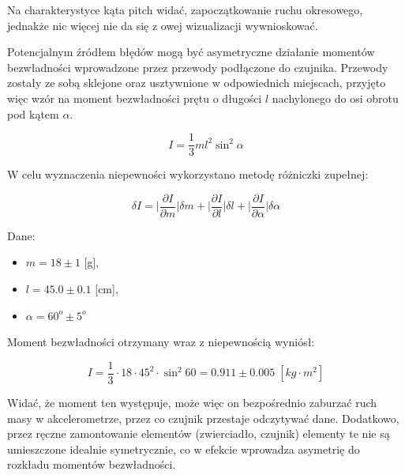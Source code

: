 Na charakterystyce kąta pitch widać, zapoczątkowanie ruchu okresowego, jednakże nic więcej nie da się z owej wizualizacji wywnioskować.

Potencjalnym źródłem błędów mogą być asymetryczne działanie momentów bezwładności wprowadzone przez przewody podłączone do czujnika. Przewody zostały ze sobą sklejone oraz usztywnione w odpowiednich miejscach, przyjęto więc wzór na moment bezwładności prętu o długości $l$ nachylonego do osi obrotu pod kątem $\alpha$.

\begin{equation}
    I = \frac{1}{3}ml^{2}\sin^{2}{\alpha}
\end{equation}

W celu wyznaczenia niepewności wykorzystano metodę różniczki zupełnej:

\begin{equation}
    \delta I = \Bigg|\frac{\partial I}{\partial m}\Bigg| \delta m + \Bigg|\frac{\partial I}{\partial l}\Bigg| \delta l + \Bigg|\frac{\partial I}{\partial \alpha}\Bigg| \delta \alpha
\end{equation}

Dane:
\begin{itemize}
    \item $m = 18 \pm 1$ [g],
    \item $l = 45.0 \pm 0.1$ [cm],
    \item $\alpha = 60^{o} \pm 5^{o}$
\end{itemize}

Moment bezwładności otrzymany wraz z niepewnością wyniósł:

$$
I = \frac{1}{3} \cdot 18 \cdot 45^{2} \cdot \sin^{2}{60} = 0.911 \pm 0.005 \; [kg \cdot m^{2}]
$$

Widać, że moment ten występuje, może więc on bezpośrednio zaburzać ruch masy w akcelerometrze, przez co czujnik przestaje odczytywać dane. Dodatkowo, przez ręczne zamontowanie elementów (zwierciadło, czujnik) elementy te nie są umieszczone idealnie symetrycznie, co w efekcie wprowadza asymetrię do rozkładu momentów bezwładności.